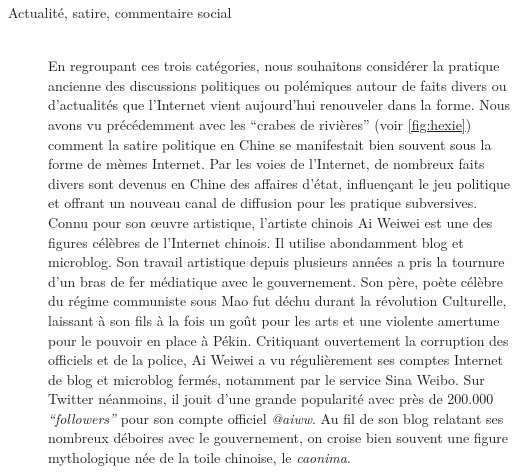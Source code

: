 \begin{description}
\item[Actualité, satire, commentaire social]
\hfill \\
En regroupant ces trois catégories, nous souhaitons considérer la pratique ancienne des discussions politiques ou polémiques autour de faits divers ou d{\textquoteright}actualités que l{\textquoteright}Internet vient aujourd{\textquoteright}hui renouveler dans la forme. Nous avons vu précédemment avec les {\textquotedblleft}crabes de rivières{\textquotedblright} (voir \ref{fig:hexie}) comment la satire politique en Chine se manifestait bien souvent sous la forme de mèmes Internet. Par les voies de l{\textquoteright}Internet, de nombreux faits divers sont devenus en Chine des affaires d{\textquoteright}état, influen\c{c}ant le jeu politique et offrant un nouveau canal de diffusion pour les pratique subversives. Connu pour son {\oe}uvre artistique, l{\textquoteright}artiste chinois Ai Weiwei est une des figures célèbres de l{\textquoteright}Internet chinois. Il utilise abondamment blog et microblog. Son travail artistique depuis plusieurs années a pris la tournure d{\textquoteright}un bras de fer médiatique avec le gouvernement. Son père, poète célèbre du régime communiste sous Mao fut déchu durant la révolution Culturelle, laissant à son fils à la fois un go\^ut pour les arts et une violente amertume pour le pouvoir en place à Pékin. Critiquant ouvertement la corruption des officiels et de la police, Ai Weiwei a vu régulièrement ses comptes Internet de blog et microblog fermés, notamment par le service Sina Weibo. Sur Twitter néanmoins, il jouit d{\textquoteright}une grande popularité avec près de 200.000 \textit{{\textquotedblleft}followers{\textquotedblright}} pour son compte officiel \textit{@aiww}. Au fil de son blog relatant ses nombreux déboires avec le gouvernement, on croise bien souvent une figure mythologique née de la toile chinoise, le \textit{caonima}.  

\begin{figure}[htpb]
    \centering
    

\end{figure}
\end{description}
